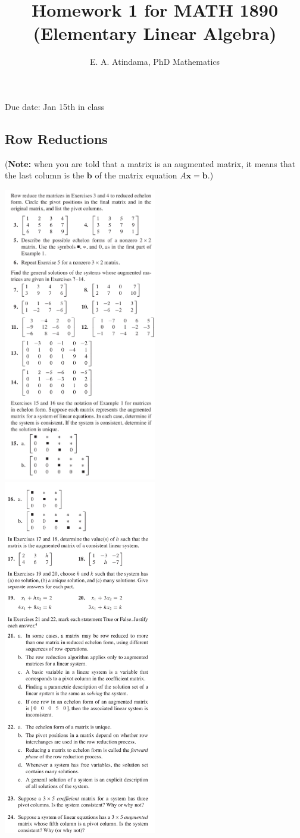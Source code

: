 \documentclass[a4paper,11pt,reqno]{amsart}
\title[MATH 1890 (Elementary Linear Algebra)]{Homework 1 for MATH 1890 (Elementary Linear Algebra)}
\author[Emmanuel Atindama]{E. A. Atindama, PhD Mathematics}
\numberwithin{equation}{section}
\begin{document}
\maketitle

Due date: Jan 15th in class
\subsection{Row Reductions}
(\textbf{Note:} when you are told that a matrix is an augmented matrix, it means that the last column is the \(\mathbf{b}\) of the matrix equation \(A\mathbf{x}=\mathbf{b}\).)

\includegraphics[width=0.5\textwidth]{exercises/rr_1.png}
\includegraphics[width=0.5\textwidth, height=1.1\textwidth]{exercises/rr_2.png}
\end{document}
